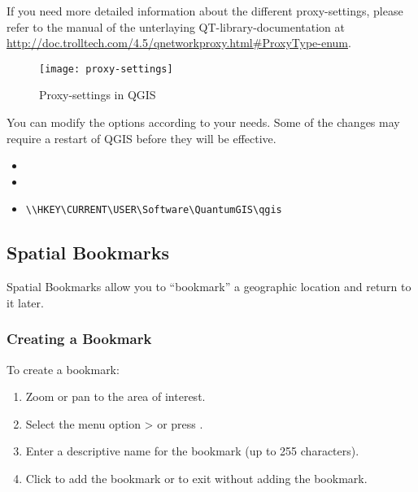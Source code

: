 If you need more detailed information about the different proxy-settings,
please refer to the manual of the unterlaying QT-library-documentation at
\url{http://doc.trolltech.com/4.5/qnetworkproxy.html#ProxyType-enum}.

\begin{figure}[ht]
   \begin{center}
   \caption{Proxy-settings in QGIS \nixcaption}
   \texttt{[image: proxy-settings]}
   \label{fig:proxy-settings}
\end{center} 
\end{figure}

\begin{Tip} \caption{\textsc{Using Proxies}}
\end{Tip}

You can modify the options according to your needs. Some of the changes may 
require a restart of QGIS before they will be effective.

\begin{itemize}
\item {}
\item {}
\item {}
\begin{verbatim}
\\HKEY\CURRENT\USER\Software\QuantumGIS\qgis
\end{verbatim}
\end{itemize}


\subsection{Spatial Bookmarks}\label{sec:bookmarks}

Spatial Bookmarks allow you to ``bookmark'' a geographic location and return to it later.

\subsubsection{Creating a Bookmark}
To create a bookmark:
\begin{enumerate}
\item Zoom or pan to the area of interest.
\item Select the menu option  >  or press .
\item Enter a descriptive name for the bookmark (up to 255 characters).
\item Click  to add the bookmark or  to exit without adding the bookmark.
\end{enumerate}

